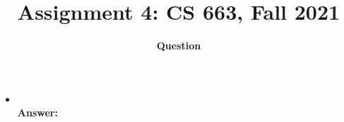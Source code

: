 \documentclass[12pt]{article}
\title{Assignment 4: CS 663, Fall 2021}
\author{\textbf{Question }}
\date{}
\begin{document}
\maketitle

\begin{itemize}
    \item

          \vspace*{0.5cm}\\
          \textbf{Answer:}
\end{itemize}
\end{document}
